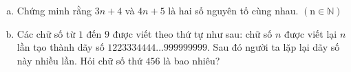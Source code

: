 \begin{ex}
	\begin{enumerate}[a)]
	\item Chứng minh rằng $3 n+4$ và $4 n+5$ là hai số nguyên tố cùng nhau. $(\mathrm{n} \in \mathbb{N})$
	\item Các chữ số từ $1$ đến $9$ được viết theo thứ tự như sau: chữ số $n$ được viết lại $n$ lần tạo thành dãy số $1223334444 \ldots 999999999$. Sau đó người ta lặp lại dãy số này nhiều lần. Hỏi chữ số thứ $456$ là bao nhiêu?
	\end{enumerate}
\end{ex}